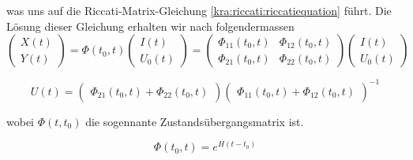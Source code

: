 was uns auf die Riccati-Matrix-Gleichung \ref{kra:riccati:riccatiequation} führt.
Die Lösung dieser Gleichung erhalten wir nach \cite{kra:kalmanisae} folgendermassen
\begin{equation}
    \begin{pmatrix}
        X(t) \\
        Y(t)
    \end{pmatrix}
    =
    \Phi(t_0, t)
    \begin{pmatrix}
        I(t) \\
        U_0(t)
    \end{pmatrix}
    =
    \begin{pmatrix}
        \Phi_{11}(t_0, t) & \Phi_{12}(t_0, t) \\
        \Phi_{21}(t_0, t) & \Phi_{22}(t_0, t)
    \end{pmatrix}
    \begin{pmatrix}
        I(t) \\
        U_0(t)
    \end{pmatrix}
\end{equation}

\begin{equation}
    U(t) =
    \begin{pmatrix}
        \Phi_{21}(t_0, t) + \Phi_{22}(t_0, t)
    \end{pmatrix}
    \begin{pmatrix}
        \Phi_{11}(t_0, t) + \Phi_{12}(t_0, t)
    \end{pmatrix}
    ^{-1}
\end{equation}

wobei $\Phi(t, t_0)$ die sogennante Zustandsübergangsmatrix ist.

\begin{equation}
    \Phi(t_0, t) = e^{H(t - t_0)}
\end{equation}



